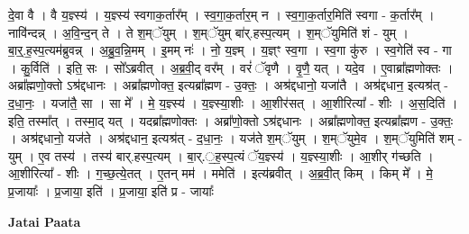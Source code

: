 \documentclass[17pt]{extarticle}
\begin{document}
दे॒वा वै । वै य॒ज्ञ्स्य॑ । य॒ज्ञ्स्य॑ स्वगाक॒र्तार᳚म् । स्व॒गा॒क॒र्तार॒म् न । स्व॒गा॒क॒र्तार॒मिति॑ स्वगा - क॒र्तार᳚म् । नावि॑न्दन्न् । अ॒वि॒न्द॒न् ते । ते श॒म्ॅयुम् । श॒म्ॅयुम् बा॑र्.हस्प॒त्यम् । श॒म्ॅयुमिति॑ शं - युम् । बा॒र्॒.ह॒स्प॒त्यम॑ब्रुवन्न् । अ॒ब्रु॒व॒न्नि॒मम् । इ॒मम् नः॑ । नो॒ य॒ज्ञ्म् । य॒ज्ञ्ꣳ स्व॒गा । स्व॒गा कु॑रु । स्व॒गेति॑ स्व - गा । कु॒र्विति॑ । इति॒ सः । सो᳚ऽब्रवीत् । अ॒ब्र॒वी॒द् वर᳚म् । वरं॑ ॅवृणै । वृ॒णै॒ यत् । यदे॒व । ए॒वाब्रा᳚ह्मणोक्तः । अब्रा᳚ह्मणो॒क्तो ऽश्र॑द्दधानः । अब्रा᳚ह्मणोक्त॒ इत्यब्रा᳚ह्मण - उ॒क्तः॒ । अश्र॑द्दधानो॒ यजा॑तै । अश्र॑द्दधान॒ इत्यश्र॑त् - द॒धा॒नः॒ । यजा॑तै॒ सा । सा मे᳚ । मे॒ य॒ज्ञ्स्य॑ । य॒ज्ञ्स्या॒शीः । आ॒शीर॑सत् । आ॒शीरित्या᳚ - शीः । अ॒स॒दिति॑ । इति॒ तस्मा᳚त् । तस्मा॒द् यत् । यदब्रा᳚ह्मणोक्तः । अब्रा᳚णो॒क्तो ऽश्र॑द्दधानः । अब्रा᳚ह्मणोक्त॒ इत्यब्रा᳚ह्मण - उ॒क्तः॒ । अश्र॑द्दधानो॒ यज॑ते । अश्र॑द्दधान॒ इत्यश्र॑त् - द॒धा॒नः॒ । यज॑ते श॒म्ॅयुम् । श॒म्ॅयुमे॒व । श॒म्ॅयुमिति॑ शम् - युम् । ए॒व तस्य॑ । तस्य॑ बार्.हस्प॒त्यम् । बा॒र्.॒ह॒स्प॒त्यं ॅय॒ज्ञ्स्य॑ । य॒ज्ञ्स्या॒शीः । आ॒शीर् ग॑च्छति । आ॒शीरित्या᳚ - शीः । ग॒च्छ॒त्ये॒तत् । ए॒तन् मम॑ । ममेति॑ । इत्य॑ब्रवीत् । अ॒ब्र॒वी॒त् किम् । किम् मे᳚ । मे॒ प्र॒जायाः᳚ । प्र॒जाया॒ इति॑ । प्र॒जाया॒ इति॑ प्र - जायाः᳚ \newline

\textbf{Jatai Paata} \newline
\end{document}
